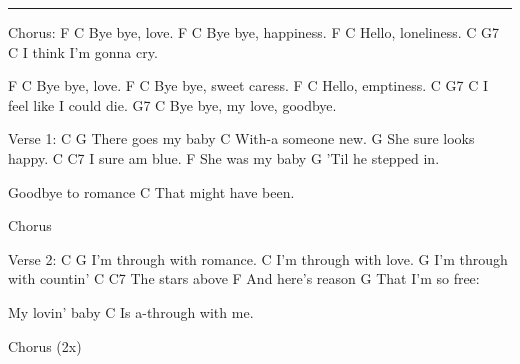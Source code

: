 \noindent\rule{\columnwidth}{1pt}

\begin{multicols}{2}
\begin{lstsong}
Chorus:
F        C
Bye bye, love.
F        C
Bye bye, happiness.
F      C
Hello, loneliness.
  C         G7    C
I think I'm gonna cry.

F        C
Bye bye, love.
F        C
Bye bye, sweet caress.
F      C
Hello, emptiness.
  C         G7       C
I feel like I could die.
            G7        C
Bye bye, my love, goodbye.

Verse 1:
C             G
There goes my baby
               C
With-a someone new.
               G
She sure looks happy.
          C   C7
I sure am blue.
           F
She was my baby
                G
'Til he stepped in.
          
Goodbye to romance
                C
That might have been.

Chorus

Verse 2:
C                G
I'm through with romance.
                 C
I'm through with love.
                  G
I'm through with countin'
           C    C7
The stars above
           F
And here's reason
            G
That I'm so free:

My lovin' baby
                  C
Is a-through with me.

Chorus (2x)
\end{lstsong}
\end{multicols}
\newpage

